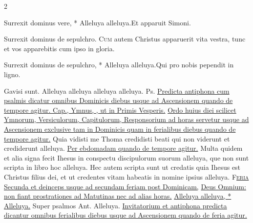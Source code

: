 \begin{multicols*}{2}
\begin{responsory-breve}
{Surrexit dominus vere, * Alleluya alleluya.}{Et apparuit Simoni.}
\end{responsory-breve}%
\V Surrexit dominus de sepulchro.
\lettrine[lines=2]{\zallmancaps \color{Red} C}{um} autem Christus apparuerit vita vestra, tunc et vos apparebitis cum ipso in gloria.
\begin{responsory-breve}
{Surrexit dominus de sepulchro, * Alleluya alleluya.}{Qui pro nobis pependit in ligno.}
\end{responsory-breve}%
\V Gavisi sunt.
 Alleluya alleluya alleluya alleluya. {\color{Red} Ps.}     
\newline \ul{Predicta antiphona cum psalmis dicatur omnibus Dominicis diebus usque ad Ascensionem quando de tempore agitur. Cap., Ymnus, \Vbar , ut in Primis Vesperis.}
\newline \ul{Ordo huius diei scilicet Ymnorum, Versiculorum, Capitulorum, Responsorium ad horas servetur usque ad Ascensionem exclusive tam in Dominicis quam in ferialibus diebus quando de tempore agitur.}
 Quia vidisti me Thoma credidisti beati qui non viderunt et crediderunt alleluya.
\newline \ul{Per ebdomadam quando de tempore agitur.}
 Multa quidem et alia signa fecit Ihesus in conspectu discipulorum suorum alleluya, que non sunt scripta in libro hoc alleluya.
 Hec autem scripta sunt ut credatis quia Ihesus est Christus filius dei, et ut credentes vitam habeatis in nomine ipsius alleluya.
\lettrine[lines=2]{\zallmancaps \color{Red} F}{}\ul{\textsc{eria} Secunda et deinceps usque ad secundam feriam post Dominicam,} \hyperlink{deus-omnium}{Deus Omnium:} \ul{non fiant prostrationes ad Matutinas nec ad alias horas.}
 \hyperlink{alleluya-invitatorium}{Alleluya alleluya, * Alleluya.} {\color{Red} Super psalmos Ant.} Alleluya.
\newline \ul{Invitatorium et antiphona predicta dicantur omnibus ferialibus diebus usque ad Ascensionem quando de feria agitur.}

\end{multicols*}
